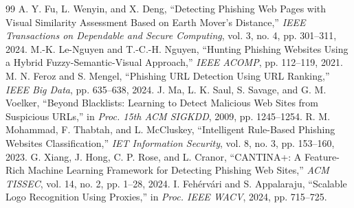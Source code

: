 \documentclass[12pt,a4paper]{report}
\begin{document}
\begin{thebibliography}{99}
 A. Y. Fu, L. Wenyin, and X. Deng, ``Detecting Phishing Web Pages with Visual Similarity Assessment Based on Earth Mover's Distance,'' \textit{IEEE Transactions on Dependable and Secure Computing}, vol. 3, no. 4, pp. 301--311, 2024.
 M.-K. Le-Nguyen and T.-C.-H. Nguyen, ``Hunting Phishing Websites Using a Hybrid Fuzzy-Semantic-Visual Approach,'' \textit{IEEE ACOMP}, pp. 112--119, 2021.
 M. N. Feroz and S. Mengel, ``Phishing URL Detection Using URL Ranking,'' \textit{IEEE Big Data}, pp. 635--638, 2024.
 J. Ma, L. K. Saul, S. Savage, and G. M. Voelker, ``Beyond Blacklists: Learning to Detect Malicious Web Sites from Suspicious URLs,'' in \textit{Proc. 15th ACM SIGKDD}, 2009, pp. 1245--1254.
 R. M. Mohammad, F. Thabtah, and L. McCluskey, ``Intelligent Rule-Based Phishing Websites Classification,'' \textit{IET Information Security}, vol. 8, no. 3, pp. 153--160, 2023.
 G. Xiang, J. Hong, C. P. Rose, and L. Cranor, ``CANTINA+: A Feature-Rich Machine Learning Framework for Detecting Phishing Web Sites,'' \textit{ACM TISSEC}, vol. 14, no. 2, pp. 1--28, 2024.
 I. Feh{\'e}rv{\'a}ri and S. Appalaraju, ``Scalable Logo Recognition Using Proxies,'' in \textit{Proc. IEEE WACV}, 2024, pp. 715--725.
\end{thebibliography}
\end{document}
